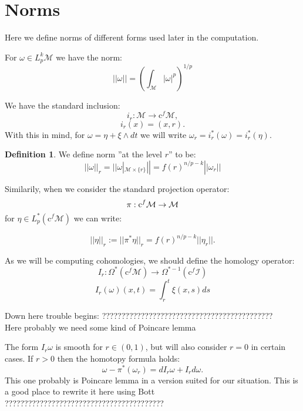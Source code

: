 \documentclass[licencjacka]{pracamgr}
\theoremstyle{definition}
\newtheorem{definition}{Definition}[section]
\theoremstyle{definition}
\theoremstyle{plain}
\theoremstyle{plain}
\def\cfm{\ensuremath\mathrm{c}^f\mathcal{M}}
\begin{document}
\section{Norms}
Here we define norms of different forms used later in the computation.

For $\omega \in L_p^k \mathcal{M}$ we have the norm:
\[
 || \omega || = ( \int_\mathcal{M} | \omega |^p ) ^ {1/p}
\]


We have the standard inclusion:
\[
    i_r: \mathcal{M} \rightarrow \mathrm{c}^f \mathcal{M},
\]
\[
    i_r(x) = (x, r).
\]
With this in mind, for $\omega = \eta + \xi \wedge dt$
 we will write 
$\omega_r = i_r^\ast(\omega) =
i_r^\ast(\eta)$. 

\begin{definition}
  We define norm ''at the level $r$'' to be:
\[
  || \omega ||_r  = || \omega |_{\mathcal{M} \times
    \{r\}} || = f(r)^{n/p - k} ||\omega_r||
\]
\end{definition}

Similarily, when we consider the standard projection operator:
\[
    \pi:\cfm \rightarrow \mathcal{M}
\]
for $\eta \in L^\ast_p(\mathrm{c}^f\mathcal{M})$ we can write:

\[
 ||\eta||_r := ||\pi^\ast\eta||_r = f(r)^{n/p - k} ||\eta_r||.
 \]



As we will be computing cohomologies, we should define the homology
operator:
\[
  I_r: \Omega^\ast( \mathrm{c}^f \mathcal{M} ) \rightarrow
  \Omega^{\ast-1}(\mathrm{c}^f \mathcal{I} ) 
\]
\[
    I_r(\omega)(x, t) = \int_r^t \xi(x, s) ds
\]

Down here trouble begins:
????????????????????????????????????????????\\
Here probably we need some kind of Poincare lemma

The form $I_r\omega$ is smooth for $r \in (0,1)$, but will also consider
$r=0$ in certain cases. If $r>0$ then the homotopy formula holds:
\[
    \omega - \pi^\ast(\omega_r) = d I_r\omega + I_rd\omega.
\] 
This one probably is Poincare lemma in a version suited for our situation.
This is a good place to rewrite it here using Bott \\ 
????????????????????????????????????????? \\
\end{document}
